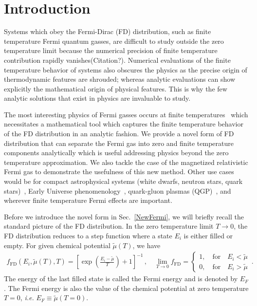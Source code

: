 \documentclass[sn-mathphys,Numbered]{sn-jnl}
\newcommand{\rsec}[1]{Sec.~{\ref{#1}}}
\newcommand*{\xred}{\color{red}}
\newcommand*{\rcite}{{\xred (Citation?)}}
\begin{document}
\section{Introduction}
\label{sec1}
Systems which obey the Fermi-Dirac (FD) distribution, such as finite temperature Fermi quantum gasses, are difficult to study outside the zero temperature limit because the numerical precision of finite temperature contribution rapidly vanishes\rcite. Numerical evaluations of the finite temperature behavior of systems also obscures the physics as the precise origin of thermodynamic features are shrouded; whereas analytic evaluations can show explicitly the mathematical origin of physical features. This is why the few analytic solutions that exist in physics are invaluable to study.

% 

The most interesting physics of Fermi gasses occurs at finite temperatures~\cite{Elze:1980er} which necessitates a mathematical tool which captures the finite temperature behavior of the FD distribution in an analytic fashion. We provide a novel form of FD distribution that can separate the Fermi gas into zero and finite temperature components analytically which is useful addressing physics beyond the zero temperature approximation. We also tackle the case of the magnetized relativistic Fermi gas to demonstrate the usefulness of this new method. Other use cases would be for compact astrophysical systems (white dwarfs, neutron stars, quark stars)~\cite{Kaspi:2017fwg,Ferrer:2019xlr,Ferrer:2023pgq}, Early Universe phenomenology~\cite{Rafelski:2021aey,Rafelski:2023emw,Grayson:2023flr,Steinmetz:2023nsc}, quark-gluon plasmas (QGP)~\cite{Letessier:2002ony,Rafelski:2020ajx,Yang:2021bko}, and wherever finite temperature Fermi effects are important.

Before we introduce the novel form in \rsec{NewFermi}, we will briefly recall the standard picture of the FD distribution. In the zero temperature limit $T\to0$, the FD distribution reduces to a step function where a state $E_{i}$ is either filled or empty. For given chemical potential $\widetilde\mu(T)$, we have
\begin{align}
\label{f_old}
f_\mathrm{FD}(E_{i},\widetilde\mu(T),T)=\left[\exp\left(\frac{E_{i}-\widetilde\mu}{T}\right)+1\right]^{-1}\,,\quad
\lim_{T\to0}f_\mathrm{FD}=\left\{
\begin{array}{c}
1,\quad\mathrm{for}\quad{E_{i}}<\widetilde\mu\\
0,\quad\mathrm{for}\quad{E_{i}}>\widetilde\mu
\end{array}
\right.\,.
\end{align}
The energy of the last filled state is called the Fermi energy and is denoted by $E_F$. The Fermi energy is also the value of the chemical potential at zero temperature $T=0$, \emph{i.e.} $E_F\equiv\widetilde\mu(T = 0)$.
\end{document}
